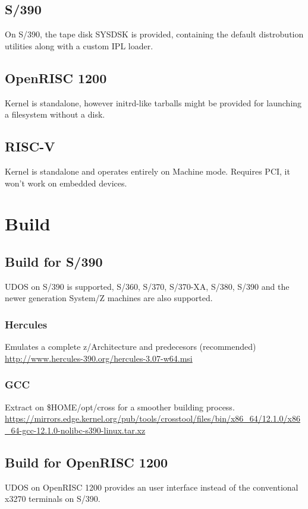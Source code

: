 \documentclass{article}
\begin{document}
\subsection{S/390}
On S/390, the tape disk SYSDSK is provided, containing the default distrobution utilities along with a custom IPL loader.

\subsection{OpenRISC 1200}
Kernel is standalone, however initrd-like tarballs might be provided for launching a filesystem without a disk.

\subsection{RISC-V}
Kernel is standalone and operates entirely on Machine mode. Requires PCI, it won't work on embedded devices.

\section{Build}
\subsection{Build for S/390}
UDOS on S/390 is supported, S/360, S/370, S/370-XA, S/380, S/390 and the newer generation System/Z machines are also supported.

\subsubsection{Hercules}
Emulates a complete z/Architecture and predecesors (recommended) \url{http://www.hercules-390.org/hercules-3.07-w64.msi}

\subsubsection{GCC}
Extract on \$HOME/opt/cross for a smoother building process.
\url{https://mirrors.edge.kernel.org/pub/tools/crosstool/files/bin/x86_64/12.1.0/x86_64-gcc-12.1.0-nolibc-s390-linux.tar.xz}

\subsection{Build for OpenRISC 1200}
UDOS on OpenRISC 1200 provides an user interface instead of the conventional x3270 terminals on S/390.
\end{document}

